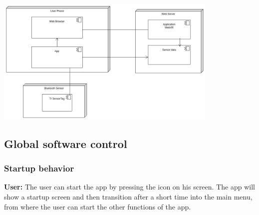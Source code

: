 \includegraphics[width=0.8\textwidth]{diagramms/hsMapping.png}



\subsection{Global software control}
\subsubsection{Startup behavior}
\textbf{User:} The user can start the app by pressing the icon on his screen.
The app will show a startup screen and then transition after a short time into the main menu, from where the user can start the other functions of the app.

